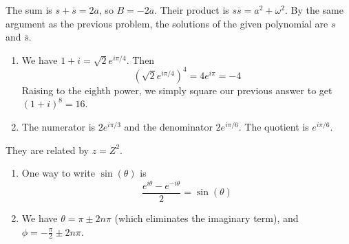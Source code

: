 \documentclass[a4paper]{article}
\begin{document}
The sum is \(s + \overline{s} = 2a\), so \(B = -2a\). Their product is \(s \overline{s} = a^{2} + \omega^{2}\). By the same argument as the previous problem, the solutions of the given polynomial are \(s\) and \(\overline{s}\).

\vspace{12pt}


\begin{enumerate}[label=(\alph*)]
	\item We have \(1 + i = \sqrt{2} e^{i \pi / 4}\). Then
	\[
		\!\left( \sqrt{2} e^{i \pi / 4} \right)^{4} = 4 e^{i \pi } = -4
	\]
	Raising to the eighth power, we simply square our previous answer to get \(\!\left( 1 + i \right)^{8} = 16\).
	\item The numerator is \(2e^{i \pi / 3}\) and the denominator \(2 e^{i \pi / 6}\). The quotient is \(e^{i \pi / 6}\).
\end{enumerate}


They are related by \(z = Z^{2}\).

\vspace{12pt}


\begin{enumerate}[label=(\alph*)]
	\item One way to write \(\sin\left( \theta  \right)\) is
	\[
		\frac{e^{i \theta } - e^{-i \theta }}{2} = \sin\left( \theta  \right)
	\]
\item We have \(\theta = \pi \pm 2n \pi \) (which eliminates the imaginary term), and \(\phi = - \frac{\pi }{2} \pm 2n \pi \). 
\end{enumerate}
\end{document}
